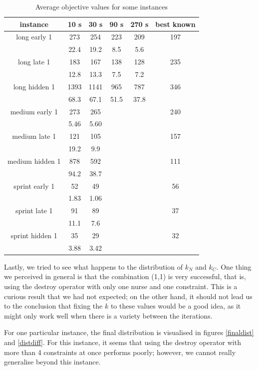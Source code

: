 \documentclass{article}
\begin{document}
\begin{table}
	\begin{tabular}{|c|c|c|c|c|c|}
		\hline
		instance & 10 s & 30 s & 90 s & 270 s & best known \\
		\hline
		long early 1 & 273 & 254 & 223 & 209 & 197 \\
		& 22.4 & 19.2& 8.5 & 5.6 & \\
		\hline
		long late 1 & 183 & 167 & 138 & 128 & 235 \\
		& 12.8 & 13.3 & 7.5 & 7.2 & \\
		\hline
		long hidden 1 & 1393 & 1141 & 965 & 787 & 346 \\
		& 68.3 & 67.1 & 51.5 & 37.8 & \\
		\hline
		medium early 1 & 273 & 265 & & & 240 \\
		& 5.46 & 5.60 & & & \\
		\hline
		medium late 1 & 121 & 105 & & & 157 \\
		& 19.2 & 9.9 & & & \\
		\hline
		medium hidden 1 & 878 & 592 & & & 111 \\
		& 94.2 & 38.7 & & & \\
		\hline
		sprint early 1 & 52 & 49 & & & 56 \\
		& 1.83 & 1.06 & & & \\
		\hline
		sprint late 1 & 91 & 89 & & & 37 \\
		& 11.1 & 7.6 & & & \\
		\hline
		sprint hidden 1 & 35 & 29 & & & 32 \\
		& 3.88 & 3.42 & & & \\
		\hline
	\end{tabular}
	\caption{Average objective values for some instances}
	\label{results}
\end{table}

Lastly, we tried to see what happens to the distribution of $k_N$ and $k_C$.
One thing we perceived in general is that the combination (1,1) is very successful, that is, using the destroy operator with only one nurse and one constraint.
This is a curious result that we had not expected; on the other hand, it should not lead us to the conclusion that fixing the $k$ to these values would be a good idea, as it might only work well when there is a variety between the iterations.

For one particular instance, the final distribution is visualised in figures \ref{finaldist} and \ref{distdiff}.
For this instance, it seems that using the destroy operator with more than 4 constraints at once performs poorly; however, we cannot really generalise beyond this instance.
\end{document}
